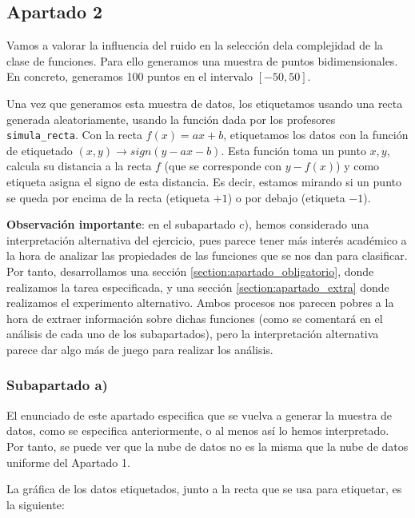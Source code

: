 \documentclass[11pt]{article}
\begin{document}
\subsection{Apartado 2}

Vamos a valorar la influencia del ruido en la selección dela complejidad de la clase de funciones. Para ello generamos una muestra de puntos bidimensionales. En concreto, generamos 100 puntos en el intervalo $[-50, 50]$.

Una vez que generamos esta muestra de datos, los etiquetamos usando una recta generada aleatoriamente, usando la función dada por los profesores \lstinline{simula_recta}. Con la recta $f(x) = ax + b$, etiquetamos los datos con la función de etiquetado $(x, y) \rightarrow sign(y - ax - b)$. Esta función toma un punto $x, y$, calcula su distancia a la recta $f$ (que se corresponde con $y - f(x)$) y como etiqueta asigna el signo de esta distancia. Es decir, estamos mirando si un punto se queda por encima de la recta (etiqueta $+1$) o por debajo (etiqueta $-1$).

\textbf{Observación importante}: en el subapartado c), hemos considerado una interpretación alternativa del ejercicio, pues parece tener más interés académico a la hora de analizar las propiedades de las funciones que se nos dan para clasificar. Por tanto, desarrollamos una sección \ref{section:apartado_obligatorio}, donde realizamos la tarea especificada, y una sección \ref{section:apartado_extra} donde realizamos el experimento alternativo. Ambos procesos nos parecen pobres a la hora de extraer información sobre dichas funciones (como se comentará en el análisis de cada uno de los subapartados), pero la interpretación alternativa parece dar algo más de juego para realizar los análisis.

\subsubsection{Subapartado a)} \label{section:ejercicio1.2.a}

El enunciado de este apartado especifica que se vuelva a generar la muestra de datos, como se especifica anteriormente, o al menos así lo hemos interpretado. Por tanto, se puede ver que la nube de datos no es la misma que la nube de datos uniforme del Apartado 1.

La gráfica de los datos etiquetados, junto a la recta que se usa para etiquetar, es la siguiente:
\end{document}

